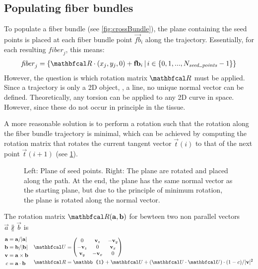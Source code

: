 \subsection{Populating fiber bundles}\label{sec:fillBundle}
%
To populate a fiber bundle (see \cref{fig:crossBundle}), the plane containing the seed points is placed at each fiber bundle point $\vec{fb}_i$ along the trajectory.
Essentially, for each resulting $\mathit{fiber}_j$, this means:
% 
\begin{align}
    \mathit{fiber}_j = \left\{ \mat{R} \cdot (x_j, y_j, 0) + \vec{fb}_i \, | \, i \in \{0,1,...,N_{\mathit{seed\tum{}points}}-1\}\right\}
\end{align}
% 
However,  the question is which rotation matrix $\mat{R}$ must be applied.
Since a trajectory is only a 2D object, \ie{}, a line, no unique normal vector can be defined.
Theoretically, any torsion can be applied to any 2D curve in space.
However, since these do not occur in principle in the tissue.
\par
% 
A more reasonable solution is to perform a rotation such that the rotation along the fiber bundle trajectory is minimal, which can be achieved by computing the rotation matrix that rotates the current tangent vector $\vec{t}(i)$ to that of the next point $\vec{t}(i+1)$ (see \cref{fig:torsion}).
%
\begin{figure}[!t]
    \centering
    \setlength{\tikzwidth}{0.75\textwidth}
    \caption{Left: Plane of seed points. Right: The plane are rotated and placed along the path. At the end, the plane has the same normal vector as the starting plane, but due to the principle of minimum rotation, the plane is rotated along the normal vector.}
    \label{fig:torsion}
\end{figure}
% 
The rotation matrix $\mat{R}(\vec{a}, \vec{b})$ for bewteen two non parallel vectors $\vec{a} \nparallel \vec{b}$ is
\begin{align}
\begin{split}
    \vec{a} =& \; \vec{a} / |\vec{a}|\\
    \vec{b} =& \; \vec{b} / |\vec{b}|\\
    \vec{v} =& \; \vec{a} \times \vec{b}\\
    c =& \; \vec{a} \cdot \vec{b}
\end{split}
\quad
\begin{split}
    \mat{U} =& \begin{pmatrix} 0 & \vec{v}_z & -\vec{v}_y\\ -\vec{v}_z & 0 & \vec{v}_x\\ \vec{v}_y & -\vec{v}_x & 0\end{pmatrix}\\
    \mat{R} =& \; \mathbb{1} + \mat{U} + (\mat{U} \cdot \mat{U}) \cdot (1 - c) / |\vec{v}|^2
\end{split}
\end{align}
